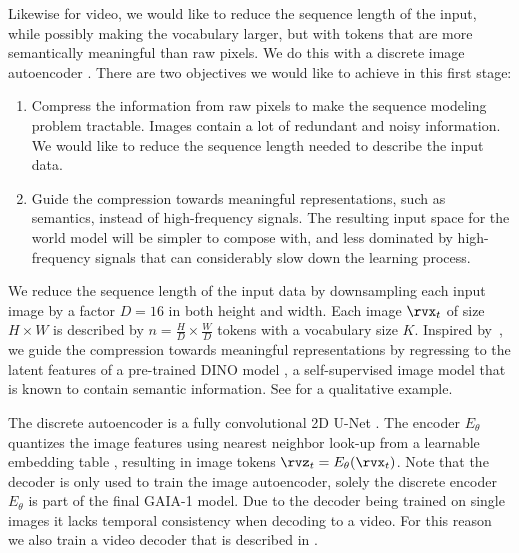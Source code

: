 Likewise for video, we would like to reduce the sequence length of the input, while possibly making the vocabulary larger, but with tokens that are more semantically meaningful than raw pixels. We do this with a discrete image autoencoder \citep{oord17}. There are two objectives we would like to achieve in this first stage:

\begin{enumerate}
    \item Compress the information from raw pixels to make the sequence modeling problem tractable. Images contain a lot of redundant and noisy information. We would like to reduce the sequence length needed to describe the input data.
    \item Guide the compression towards meaningful representations, such as semantics, instead of high-frequency signals. The resulting input space for the world model will be simpler to compose with, and less dominated by high-frequency signals that can considerably slow down the learning process.
\end{enumerate}

We reduce the sequence length of the input data by downsampling each input image by a factor $D=16$ in both height and width. Each image $\rvx_t$ of size $H\times W$ is described by $n=\frac{H}{D} \times \frac{W}{D}$ tokens with a vocabulary size $K$. Inspired by~\citep{peng2022beit}, we guide the compression towards meaningful representations by regressing to the latent features of a pre-trained DINO model \citep{caron2021emerging}, a self-supervised image model that is known to contain semantic information. See  for a qualitative example.

The discrete autoencoder is a fully convolutional 2D U-Net \citep{ronneberger15}. The encoder $E_{\theta}$ quantizes the image features using nearest neighbor look-up from a learnable embedding table \cite{oord17}, resulting in image tokens $\rvz_t = E_{\theta}(\rvx_t)$.  Note that the decoder is only used to train the image autoencoder, solely the discrete encoder $E_{\theta}$ is part of the final GAIA-1 model. Due to the decoder being trained on single images it lacks temporal consistency when decoding to a video. For this reason we also train a video decoder that is described in . 

